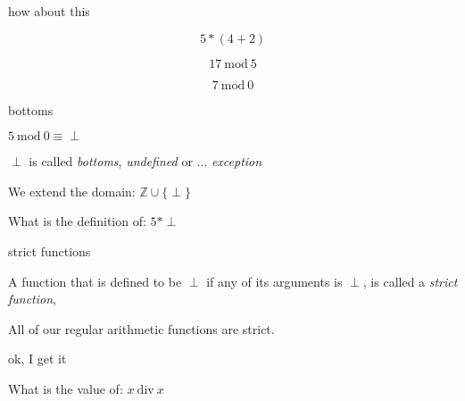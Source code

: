 \begin{frame}{how about this}

\pause
$$5 * (4+2)$$

\pause
$$17 \ \mathrm{mod}\  5$$

\pause

$$7 \ \mathrm{mod}\  0$$

\end{frame}

\begin{frame}{bottoms}

\pause

\vspace{20pt}\hspace{60pt}$ 5 \ \mathrm{mod}\ 0 \equiv \perp$

\pause

\vspace{20pt}\hspace{60pt}$\perp$ is called {\em bottoms}, {\em undefined} or ... {\em exception}
\pause

\vspace{20pt}\hspace{60pt}We extend the domain: $\mathbb{Z} \cup \{\perp\}$

\pause 

\vspace{20pt}\hspace{60pt}What is the definition of: $5 * \perp$

\end{frame}

\begin{frame}{strict functions}

\vspace{20pt}\hspace{80pt}\parbox[l][60pt][l]{240pt}{

A function that is defined to be $\perp$ if any of its arguments is $\perp$, is called a {\em strict function},

\vspace{20pt}All of our regular arithmetic functions are strict.
}

\end{frame}

\begin{frame}{ok, I get it}

\vspace{20pt}\hspace{40pt}What is the value of: $x\ \mathrm{div}\ x$

\end{frame}

